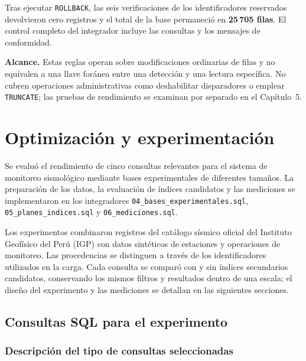 \documentclass[12pt,a4paper]{article}
\begin{document}
Tras ejecutar \texttt{ROLLBACK}, las seis verificaciones de los
identificadores reservados devolvieron cero registros y el total de
la base permaneció en \textbf{25\,705 filas}. El control completo
del integrador incluye las consultas y los mensajes de conformidad.

\textbf{Alcance.} Estas reglas operan sobre modificaciones ordinarias
de filas y no equivalen a una llave foránea entre una detección y
una lectura específica. No cubren operaciones administrativas como deshabilitar disparadores
o emplear \texttt{TRUNCATE}; las pruebas de rendimiento se examinan
por separado en el Capítulo~5.


\section{Optimización y experimentación}
\label{sec:optimizacion-experimentacion}

Se evaluó el rendimiento de cinco consultas relevantes para el
sistema de monitoreo sismológico mediante bases experimentales de
diferentes tamaños. La preparación de los datos, la evaluación de
índices candidatos y las mediciones se implementaron en los
integradores \texttt{04\_bases\_experimentales.sql},
\texttt{05\_planes\_indices.sql} y \texttt{06\_mediciones.sql}.

Los experimentos combinaron registros del catálogo sísmico oficial
del Instituto Geofísico del Perú (IGP) con datos sintéticos de
estaciones y operaciones de monitoreo. Las procedencias se distinguen
a través de los identificadores utilizados en la carga. Cada consulta
se comparó con y sin índices secundarios candidatos, conservando los
mismos filtros y resultados dentro de una escala; el diseño del
experimento y las mediciones se detallan en las siguientes secciones.

\subsection{Consultas SQL para el experimento}
\label{sec:consultas-experimento}

\subsubsection{Descripción del tipo de consultas seleccionadas}
\label{sec:descripcion-consultas-experimento}
\end{document}
